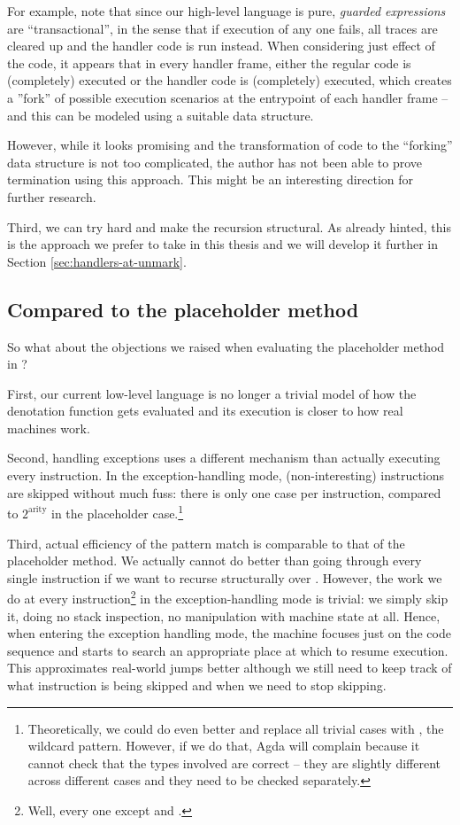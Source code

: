 For example, note that since our high-level language is pure,
\emph{guarded expressions} are
``transactional'', in the sense that if execution of any one fails, all traces
are cleared up and the handler code is run instead. When considering just
effect of the code, it appears that in every handler frame, either the regular
code is (completely) executed or the handler code is (completely) executed,
which creates a ''fork'' of possible execution scenarios at the entrypoint of
each handler frame -- and this can be modeled using a suitable data structure.
\label{sec:forks}

However, while it looks promising and the transformation of code to the
``forking'' data structure is not too complicated, the author has not been able
to prove termination using this approach. This might be an interesting direction
for further research.

Third, we can try hard and make the recursion structural. As already hinted,
this is the approach we prefer to take in this thesis and we will develop it
further in Section \ref{sec:handlers-at-unmark}.

\subsection{Compared to the placeholder method}

So what about the objections we raised when evaluating the placeholder method
in ?

First, our current low-level language is no longer a trivial model of how the
denotation function  gets evaluated and its execution is closer
to how real machines work.

Second, handling exceptions uses a different mechanism than actually executing
every instruction. In the exception-handling mode, (non-interesting)
instructions are skipped without much fuss: there is only one case per
instruction, compared to $2^\mathrm{arity}$ in the placeholder
case.\footnote{Theoretically, we could do even better and replace all trivial
cases with \ident{\_}, the wildcard pattern. However, if we do that, Agda will
complain because it cannot check that the types involved are correct
-- they are slightly different across different cases and they need to be
checked separately.}

Third, actual efficiency of the pattern match is comparable to that of the
placeholder method. We actually cannot do better than going through every
single instruction if we want to recurse structurally over .
However, the work we do at every instruction\footnote{Well, every one
except  and .} in the exception-handling mode is
trivial: we simply skip it, doing no stack inspection, no manipulation with machine
state at all.  Hence, when entering the exception handling mode, the machine
focuses just on the code sequence and starts to search an appropriate place at which
to resume execution. This approximates real-world jumps better although we still
need to keep track of what instruction is being skipped and when we need to
stop skipping.

